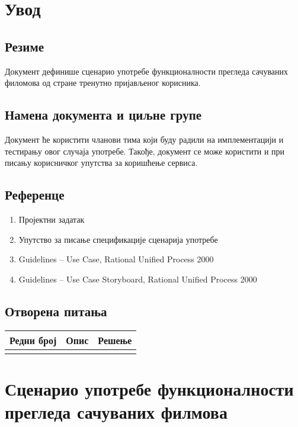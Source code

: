 \section{Увод}

\subsection{Резиме}

Документ дефинише сценарио употребе функционалности прегледа сачуваних филомова од стране тренутно пријављеног
корисника.

\subsection{Намена документа и циљне групе}

Документ ће користити чланови тима који буду радили на имплементацији и тестирању овог случаја
употребе. Такође, документ се може користити и при писању корисничког упутства за коришћење
сервиса.

\subsection{Референце}

\begin{enumerate}
    \item Пројектни задатак
    \item Упутство за писање спецификације сценарија употребе
    \item Guidelines – Use Case, Rational Unified Process 2000
    \item Guidelines – Use Case Storyboard, Rational Unified Process 2000
\end{enumerate}

\subsection{Отворена питања}

\noindent
\setcellgapes{4pt}
\makegapedcells
\begin{tabularx}{\linewidth}{|l|X|X|}
    \hline
    \textbf{Редни број} & \textbf{Опис} & \textbf{Решење} \\
    \hline
    & & \\
    \hline
\end{tabularx}

\section{Сценарио употребе функционалности прегледа сачуваних филмова}

